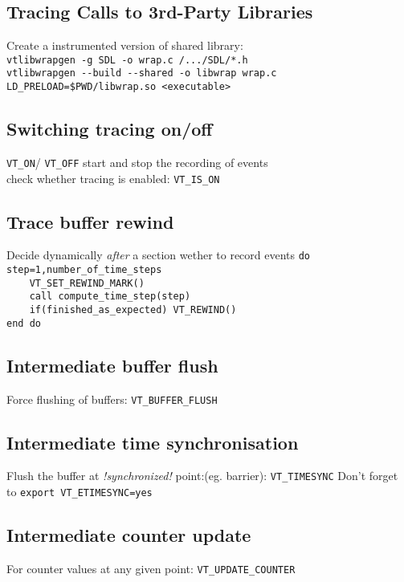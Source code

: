 \begin{multicols}{3}
\subsection{Tracing Calls to 3rd-Party Libraries}
Create a instrumented version of shared library:\\
\verb!vtlibwrapgen -g SDL -o wrap.c /.../SDL/*.h!\\
\verb!vtlibwrapgen --build --shared -o libwrap wrap.c!\\
\verb!LD_PRELOAD=$PWD/libwrap.so <executable>!

\subsection{Switching tracing on/off}
\texttt{VT\_ON}/ \texttt{VT\_OFF} start and stop the recording of events\\
check whether tracing is enabled: \texttt{VT\_IS\_ON}

\subsection{Trace buffer rewind}
Decide dynamically \textit{after} a section wether to record events
\verb!do step=1,number_of_time_steps!\\
\verb!    VT_SET_REWIND_MARK()!\\
\verb!    call compute_time_step(step)!\\
\verb!    if(finished_as_expected) VT_REWIND()!\\
\verb!end do!

\subsection{Intermediate buffer flush}
Force flushing of buffers: \texttt{VT\_BUFFER\_FLUSH}

\subsection{Intermediate time synchronisation}
Flush the buffer at \textit{!synchronized!} point:(eg. barrier): \texttt{VT\_TIMESYNC}
Don't forget to \texttt{export VT\_ETIMESYNC=yes}

\subsection{Intermediate counter update}
For counter values at any given point: \texttt{VT\_UPDATE\_COUNTER}


\end{multicols}
